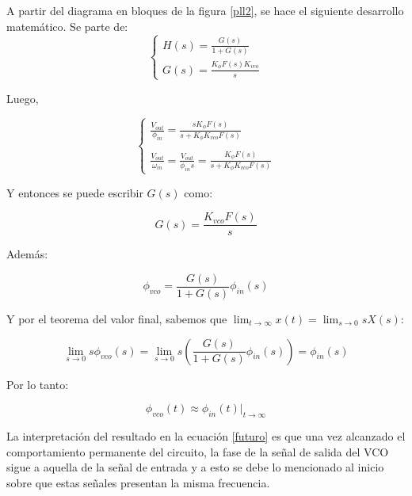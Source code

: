 A partir del diagrama en bloques de la figura \ref{pll2}, se hace el siguiente desarrollo matem\'atico. Se parte de:
\begin{equation}
	\begin{cases}
		H(s) = \frac{G(s)}{1+G(s)}\\
		G(s) = \frac{K_{\phi}F(s)K_{vco}}{s}
	\end{cases}
\end{equation}

Luego, 

\begin{equation}
\begin{cases}
	\frac{V_{out}}{\phi_{in}} = \frac{sK_{\phi}F(s)}{s+K_{\phi}K_{vco}F(s)}\\ \\
	\frac{V_{out}}{\omega_{in}}=\frac{V_{out}}{\phi_{in}s} = \frac{K_{\phi}F(s)}{s+K_{\phi}K_{vco}F(s)}
	\end{cases}
\end{equation}

Y entonces se puede escribir $G(s)$ como:

\begin{equation}
	G(s) = \frac{K_{vco}F(s)}{s}
\end{equation}
	
Adem\'as:

\begin{equation}
	\phi_{vco} = \frac{G(s)}{1+G(s)}\phi_{in}(s)
\end{equation}

Y por el teorema del valor final, sabemos que $\lim_{t\rightarrow\infty}{x(t)} = \lim_{s\rightarrow0}{sX(s)}$:

\begin{equation}
	\lim_{s\rightarrow0}{s\phi_{vco}(s)} = \lim_{s\rightarrow0}{s\left( \frac{G(s)}{1 + G(s)}\phi_{in}(s) \right)} = \phi_{in} (s)
\end{equation}

Por lo tanto:

\begin{equation}
	\phi_{vco}(t) \approx \phi_{in}(t)|_{t\to\infty} 
	\label{futuro}
\end{equation}

La interpretaci\'on del resultado en la ecuaci\'on \ref{futuro} es que una vez alcanzado el comportamiento permanente del circuito, la fase de la señal de salida del VCO sigue a aquella de la señal de entrada y a esto se debe lo mencionado al inicio sobre que estas señales presentan la misma frecuencia.

